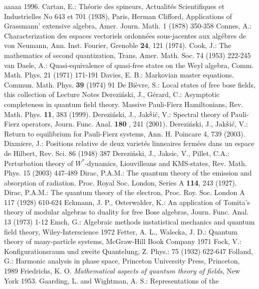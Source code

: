 \documentclass{svmult}
\begin{document}
\begin{remark}
\begin{thebibliography}{aaaaa}
1996.
Cartan, E.: Th\'eorie des spineurs, Actualit\'{e}s Scientifiques et
Industrielles No 643 et 701 (1938), Paris, Herman
 Clifford, Applications of Grassmann' extensive algebra,
  Amer. Journ. Math. 1 (1878) 350-358
 Connes, A.: Characterization des espaces vectoriels
ordonn\'{e}es sous-jacentes aux alg\'{e}bres de von Neumann,
Ann. Inst. Fourier, Grenoble {\bf 24}, 121 (1974).
 Cook, J.: The mathematics of second quantization,
  Trans. Amer. Math. Soc. 74 (1953) 222-245
 van Daele, A.: Quasi-equivalence of quasi-free states on the
  Weyl algebra, Comm. Math. Phys. 21 (1971) 171-191
 Davies, E. B.:  Markovian master equations.
Commun. Math. Phys. {\bf 39} (1974) 91
 De Bi\`{e}vre, S.: Local states of free bose fields, this
  collection of Lecture Notes
 Derezi\'nski, J., G\'erard, C.: Asymptotic 
completeness in quantum field theory. Massive Pauli-Fierz Hamiltonians, 
Rev. Math. Phys. {\bf 11}, 383 (1999).
Derezi\'nski, J., Jak${\check {\rm s}}$i\'c, V.: Spectral theory of
Pauli-Fierz operators, Journ. Func. Anal. {\bf 180} , 241 (2001).
Derezi\'nski, J., Jak${\check {\rm s}}$i\'c, V.: Return to equilibrium
for Pauli-Fierz systems, Ann. H. Poincare 4, 739 (2003).  
 Dixmiere, J.: Positions relative de deux variet\'{e}s linneaires
  ferm\'{e}es dans un espace de Hilbert, Rev. Sci. 86 (1948) 387
 Derezi\'{n}ski, J., Jaksic, V., Pillet, C.A.: Perturbation
  theory of $W^*$-dynamics, Liouvilleans and KMS-states, Rev. Math. Phys. 15
  (2003) 447-489
 Dirac, P.A.M.: The quantum theory of the emission and 
absorption of radiation. Proc. Royal Soc. London, Series A {\bf 114}, 243 
(1927). 
 Dirac, P.A.M.: The quantum theory of the electron,
  Proc. Roy. Soc. London A 117 (1928) 610-624
Eckmann, J. P., Osterwalder, K.: An  application of Tomita's theory of modular
algebras to duality for free Bose algebras, Journ. Func. Anal. 13 (1973) 1-12
 Emch, G.:
Algebraic methods instatistical mechanics and quantum field theory,
Wiley-Interscience 1972
 Fetter, A. L., Walecka, J. D.: Quantum theory of
  many-particle systems, McGraw-Hill Book Company 1971
 Fock, V.: Konfigurationsraum und zweite Quantelung, Z. Phys.:
  75 (1932) 622-647
  Folland, G.: Harmonic analysis in phase space, Princeton
  University Press, Princeton, 1989
 Friedrichs, K. O. {\em Mathematical aspects of
quantum theory of fields}, New York 1953.
 Gaarding, L. and Wightman, A. S.: Representations of the

\end{thebibliography}
\end{remark}
\end{document}
